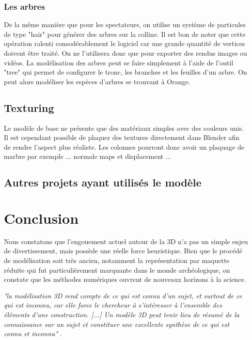 \subsection{Les arbres}
De la même manière que pour les spectateurs, on utilise un système de \glspl{particule} de type "hair" pour générer des arbres sur la colline. Il est bon de noter que cette opération ralenti consodérablement le logiciel car une grande quantité de vertices doivent être traité. On ne l'utilisera donc que pour exporter des rendus images ou vidéos. La modélisation des arbres peut se faire simplement à l'aide de l'outil "tree" qui permet de configurer le tronc, les branches et les feuilles d'un arbre. On peut alors modéliser les espèces d'arbres se trouvant à Orange.


\section{Texturing} 
Le modèle de base ne présente que des matériaux simples avec des couleurs unis. Il est cependant possible de plaquer des textures directement dans Blender afin de rendre l'aspect plus réaliste. Les colonnes pourront donc avoir un plaquage de marbre par exemple 
... normale maps et displacement ...

\section{Autres projets ayant utilisés le modèle}
		
	\chapter*{Conclusion}
Nous constatons que l'engouement actuel autour de la 3D n'a pas un simple enjeu de divertissement, mais possède une réelle force heuristique. Bien que le procédé de modélisation soit très ancien, notamment la représentation par maquette réduite qui fut particulièrement marquante dans le monde archéologique, on constate que les méthodes numériques ouvrent de nouveaux horizons à la science. 	

\textit{"la modélisation 3D rend compte de ce qui est connu d’un sujet, et surtout de ce qui est inconnu, car elle force le chercheur à s’intéresser à l’ensemble des éléments d’une construction. [...] Un modèle 3D peut tenir lieu de résumé de la connaissance sur un sujet et constituer une excellente synthèse de ce qui est connu et inconnu"}  \cite{rocheleau}.
	
	
	
			
 \nocite{*}
 
 


